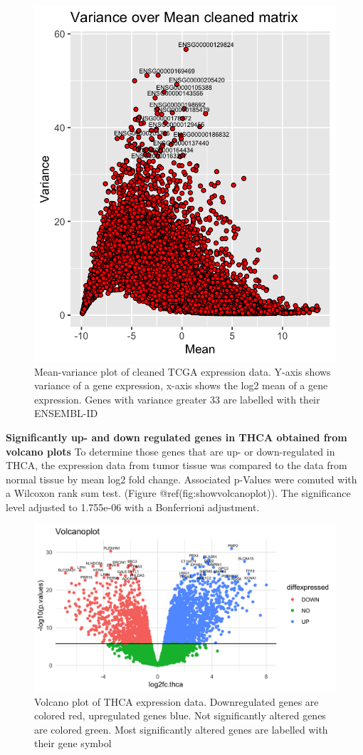 \documentclass[
]{article}
\begin{document}
\begin{figure}

{\centering \includegraphics[width=0.65\linewidth]{figures/Variance_over mean_cleaned_matrix} 

}

\caption{Mean-variance plot of cleaned TCGA expression data. Y-axis shows variance of a gene expression, x-axis shows the log2 mean of a gene expression. Genes with variance greater 33 are labelled with their ENSEMBL-ID}\label{fig:showmeanvariance}
\end{figure}

\textbf{Significantly up- and down regulated genes in THCA obtained from
volcano plots} To determine those genes that are up- or down-regulated
in THCA, the expression data from tumor tissue was compared to the data
from normal tissue by mean log2 fold change. Associated p-Values were
comuted with a Wilcoxon rank sum test. (Figure
@ref(fig:showvolcanoplot)). The significance level adjusted to 1.755e-06
with a Bonferrioni adjustment.

\begin{figure}

{\centering \includegraphics[width=1\linewidth]{figures/Volcanoplot} 

}

\caption{Volcano plot of THCA expression data. Downregulated genes are colored red, upregulated genes blue. Not significantly altered genes are colored green. Most significantly altered genes are labelled with their gene symbol}\label{fig:showvolcanoplot}
\end{figure}
\end{document}

